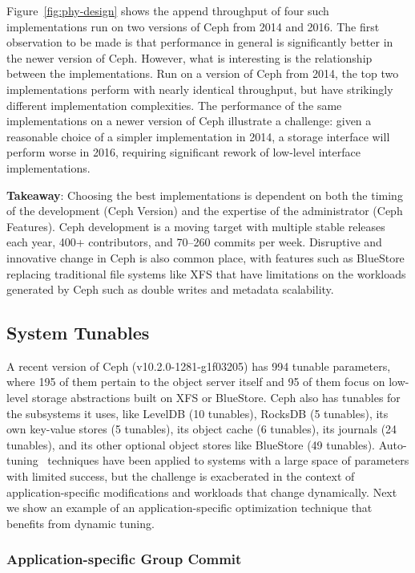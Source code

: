 Figure~\ref{fig:phy-design} shows the append throughput of four such
implementations run on two versions of Ceph from 2014 and 2016. The first
observation to be made is that performance in general is significantly better
in the newer version of Ceph. However, what is interesting is the relationship
between the implementations. Run on a version of Ceph from 2014, the top two
implementations perform with nearly identical throughput, but have strikingly
different implementation complexities. The performance of the same
implementations on a newer version of Ceph illustrate a challenge: given a
reasonable choice of a simpler implementation in 2014, a storage interface
will perform worse in 2016, requiring significant rework of low-level
interface implementations.

\textbf{Takeaway}: Choosing the best implementations is dependent on both the
timing of the development (Ceph Version) and the expertise of the
administrator (Ceph Features). Ceph development is a moving target with
multiple stable releases each year, 400+ contributors, and 70--260 commits per
week.  Disruptive and innovative change in Ceph is also common place, with
features such as BlueStore~\cite{weil:vault2016-bluestore} replacing
traditional file systems like XFS that have limitations on the workloads
generated by Ceph such as double writes and metadata scalability. 

\subsection{System Tunables}

A recent version of Ceph (v10.2.0-1281-g1f03205) has 994 tunable
parameters, where 195 of them pertain to the object server itself
and 95 of them focus on low-level storage abstractions built on XFS or
BlueStore. Ceph also has tunables for the subsystems it uses, like
LevelDB (10 tunables), RocksDB (5 tunables), its own key-value stores (5
tunables), its object cache (6 tunables), its journals (24 tunables), and its
other optional object stores like BlueStore (49 tunables).
Auto-tuning~\cite{behzad:sc2013-autotuning} techniques have been applied to
systems with a large space of parameters with limited success, but the
challenge is exacberated in the context of application-specific modifications
and workloads that change dynamically. Next we show an example of an
application-specific optimization technique that benefits from dynamic tuning.

\subsubsection{Application-specific Group Commit}

